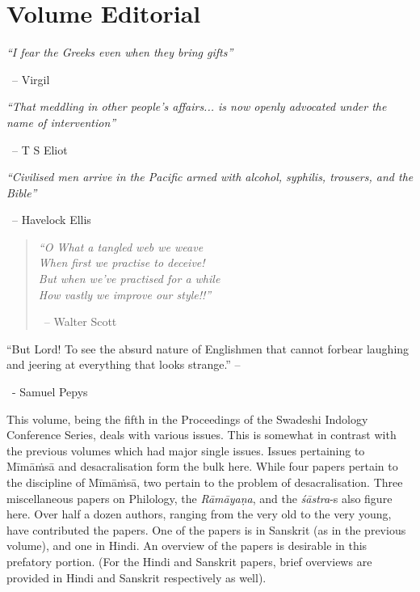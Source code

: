 
\chapter*{Volume Editorial}

\begin{myquote}
\textit{“I fear the Greeks even when they bring gifts”} 

~\hfill – Virgil
\end{myquote}

\begin{myquote}
\textit{“That meddling in other people’s affairs... is now openly advocated under the name of intervention”} 

~\hfill – T S Eliot
\end{myquote}

\begin{myquote}
\textit{“Civilised men arrive in the Pacific armed with alcohol, syphilis, trousers, and the Bible”} 

~\hfill – Havelock Ellis
\end{myquote}

\begin{verse}
\textit{“O What a tangled web we weave\\ When first we practise to deceive!\\ But when we’ve practised for a while\\ How vastly we improve our style!!”} 

~\hfill – Walter Scott
\end{verse}

\begin{myquote}
“But Lord! To see the absurd nature of Englishmen that cannot forbear laughing and jeering at everything that looks strange.” – 

~\hfill - Samuel Pepys
\end{myquote}

This volume, being the fifth in the Proceedings of the Swadeshi Indology Conference Series, deals with various issues. This is somewhat in contrast with the previous volumes which had major single issues. Issues pertaining to Mīmāṁsā and desacralisation form the bulk here. While four papers pertain to the discipline of Mīmāṁsā, two pertain to the problem of desacralisation. Three miscellaneous papers on Philology, the \textit{Rāmāyaṇa}, and the \textit{śāstra}-s also figure here. Over half a dozen authors, ranging from the very old to the very young, have contributed the papers. One of the papers is in Sanskrit (as in the previous volume), and one in Hindi. An overview of the papers is desirable in this prefatory portion. (For the Hindi and Sanskrit papers, brief overviews are provided in Hindi and Sanskrit respectively as well).

